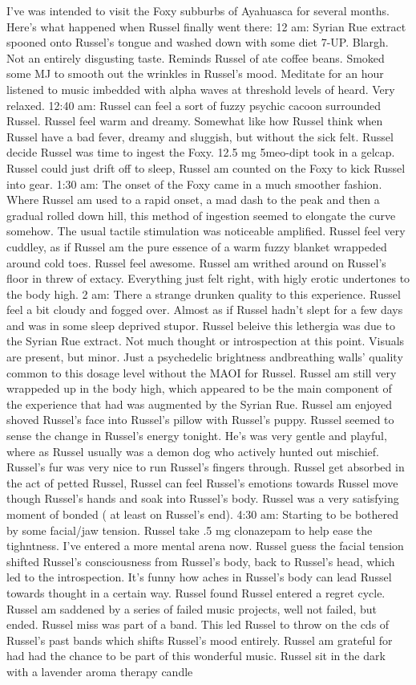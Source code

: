 \documentclass[12pt]{book}
\begin{document}
I've was intended to visit the Foxy subburbs of Ayahuasca for several months. Here's what happened when Russel finally went there: 12 am: Syrian Rue extract spooned onto Russel's tongue and washed down with some diet 7-UP. Blargh. Not an entirely disgusting taste. Reminds Russel of ate coffee beans. Smoked some MJ to smooth out the wrinkles in Russel's mood. Meditate for an hour listened to music imbedded with alpha waves at threshold levels of heard. Very relaxed. 12:40 am: Russel can feel a sort of fuzzy psychic cacoon surrounded Russel. Russel feel warm and dreamy. Somewhat like how Russel think when Russel have a bad fever, dreamy and sluggish, but without the sick felt. Russel decide Russel was time to ingest the Foxy. 12.5 mg 5meo-dipt took in a gelcap. Russel could just drift off to sleep, Russel am counted on the Foxy to kick Russel into gear. 1:30 am: The onset of the Foxy came in a much smoother fashion. Where Russel am used to a rapid onset, a mad dash to the peak and then a gradual rolled down hill, this method of ingestion seemed to elongate the curve somehow. The usual tactile stimulation was noticeable amplified. Russel feel very cuddley, as if Russel am the pure essence of a warm fuzzy blanket wrappeded around cold toes. Russel feel awesome. Russel am writhed around on Russel's floor in threw of extacy. Everything just felt right, with higly erotic undertones to the body high. 2 am: There a strange drunken quality to this experience. Russel feel a bit cloudy and fogged over. Almost as if Russel hadn't slept for a few days and was in some sleep deprived stupor. Russel beleive this lethergia was due to the Syrian Rue extract. Not much thought or introspection at this point. Visuals are present, but minor. Just a psychedelic brightness andbreathing walls' quality common to this dosage level without the MAOI for Russel. Russel am still very wrappeded up in the body high, which appeared to be the main component of the experience that had was augmented by the Syrian Rue. Russel am enjoyed shoved Russel's face into Russel's pillow with Russel's puppy. Russel seemed to sense the change in Russel's energy tonight. He's was very gentle and playful, where as Russel usually was a demon dog who actively hunted out mischief. Russel's fur was very nice to run Russel's fingers through. Russel get absorbed in the act of petted Russel, Russel can feel Russel's emotions towards Russel move though Russel's hands and soak into Russel's body. Russel was a very satisfying moment of bonded ( at least on Russel's end). 4:30 am: Starting to be bothered by some facial/jaw tension. Russel take .5 mg clonazepam to help ease the tighntness. I've entered a more mental arena now. Russel guess the facial tension shifted Russel's consciousness from Russel's body, back to Russel's head, which led to the introspection. It's funny how aches in Russel's body can lead Russel towards thought in a certain way. Russel found Russel entered a regret cycle. Russel am saddened by a series of failed music projects, well not failed, but ended. Russel miss was part of a band. This led Russel to throw on the cds of Russel's past bands which shifts Russel's mood entirely. Russel am grateful for had had the chance to be part of this wonderful music. Russel sit in the dark with a lavender aroma therapy candle 
\end{document}
